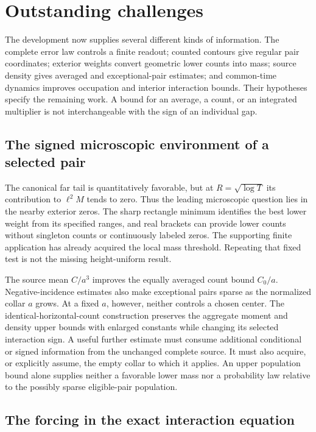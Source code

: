 \section{Outstanding challenges}
\label{sec:gt-challenges}

The development now supplies several different kinds of information.
The complete error law controls a finite readout; counted contours give
regular pair coordinates; exterior weights convert geometric lower
counts into mass; source density gives averaged and exceptional-pair
estimates; and common-time dynamics improves occupation and interior
interaction bounds. Their hypotheses specify the remaining work.
A bound for an average, a count, or an integrated multiplier is not
interchangeable with the sign of an individual gap.

\subsection{The signed microscopic environment of a selected pair}

The canonical far tail is quantitatively favorable, but at
\(R=\sqrt{\log T}\) its contribution to \(\ell^2M\) tends to zero.
Thus the leading microscopic question lies in the nearby exterior zeros.
The sharp rectangle minimum identifies the best lower weight from its
specified ranges, and real brackets can provide lower counts without
singleton counts or continuously labeled zeros. The supporting finite
application has already acquired the local mass threshold. Repeating
that fixed test is not the missing height-uniform result.

The source mean \(C/a^3\) improves the equally averaged count bound
\(C_0/a\). Negative-incidence estimates also make exceptional pairs
sparse as the normalized collar \(a\) grows. At a fixed \(a\), however,
neither controls a chosen center. The identical-horizontal-count
construction preserves the aggregate moment and density upper bounds
with enlarged constants while changing its selected interaction sign.
A useful further estimate must consume additional conditional or signed
information from the unchanged complete source. It must also acquire,
or explicitly assume, the empty collar to which it applies. An upper
population bound alone supplies neither a favorable lower mass nor a
probability law relative to the possibly sparse eligible-pair population.

\subsection{The forcing in the exact interaction equation}

